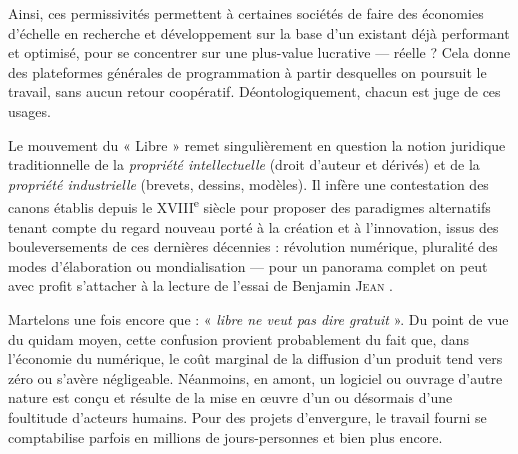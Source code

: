 Ainsi, ces permissivités permettent à certaines sociétés de faire des économies d'échelle en recherche et développement sur la base d'un existant déjà performant et optimisé, pour se concentrer sur une plus-value lucrative --- réelle ? Cela donne des plateformes générales de programmation à partir desquelles on poursuit le travail, sans aucun retour coopératif. Déontologiquement, chacun est juge
de ces usages.


Le mouvement du « Libre » remet singulièrement en question la notion juridique traditionnelle de la \emph{propriété intellectuelle} (droit d'auteur et dérivés) et de la \emph{propriété industrielle} (brevets, dessins, modèles). Il infère une contestation des canons établis depuis le XVIII\textsuperscript{e} siècle pour proposer des paradigmes alternatifs tenant compte du regard nouveau porté à la création et à l'innovation, issus des bouleversements de ces dernières décennies : révolution numérique, pluralité des modes d'élaboration ou mondialisation --- pour un panorama complet on peut avec profit s'attacher à la lecture de l'essai de Benjamin \textsc{Jean} \parencite{Jean:2011}.

Martelons une fois encore que : « \emph{libre ne veut pas dire gratuit} ». Du point de vue du quidam moyen, cette confusion provient probablement du fait que, dans l'économie du numérique, le coût marginal de la diffusion d'un produit tend vers zéro ou s'avère négligeable. Néanmoins, en amont, un logiciel ou ouvrage d'autre nature est conçu et résulte de la mise en œuvre d'un ou désormais d'une foultitude d'acteurs humains. Pour des projets d'envergure, le travail fourni se comptabilise parfois en millions de jours-personnes et bien plus encore. 

